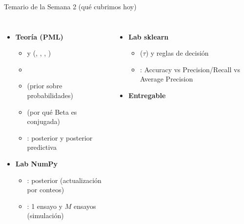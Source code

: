 \begin{frame}{Temario de la Semana 2 (qué cubrimos hoy)}

\begin{columns}[t]
\begin{itemize}
  \item \textbf{Teoría (PML)}
  \begin{itemize}
    \small
    \item {} y  (, , , ) \hfill {}
    \item {} \hfill {}
    \item {} (prior sobre probabilidades) \hfill {}
    \item {} (por qué Beta es conjugada) \hfill {}
    \item {}: posterior y posterior predictiva \hfill {}
  \end{itemize}

  \item \textbf{Lab NumPy}
  \begin{itemize}
    \small
    \item {}: posterior (actualización por conteos)
    \item {}: 1 ensayo y \(M\) ensayos (simulación)
  \end{itemize}
\end{itemize}

\begin{itemize}
  \item \textbf{Lab sklearn}
  \begin{itemize}
    \small
    \item {} (\(\tau\)) y reglas de decisión
    \item {}: Accuracy vs Precision/Recall vs Average Precision
  \end{itemize}
  \item \textbf{Entregable}
\end{itemize}
\end{columns}
\end{frame}

